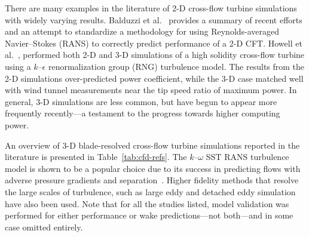 \documentclass[aip,graphicx]{revtex4-1}
\begin{document}
There are many examples in the literature of 2-D cross-flow turbine simulations
with widely varying results. Balduzzi et al.~\cite{Balduzzi2016} provides
a summary of recent efforts and an attempt to standardize a methodology for
using Reynolds-averaged Navier--Stokes (RANS) to correctly predict performance
of a 2-D CFT. Howell et al.~\cite{Howell2010}, performed both 2-D and 3-D
simulations of a high solidity cross-flow turbine using a $k$--$\epsilon$
renormalization group (RNG) turbulence model. The results from the 2-D
simulations over-predicted power coefficient, while the 3-D case matched well
with wind tunnel measurements near the tip speed ratio of maximum power. In
general, 3-D simulations are less common, but have begun to appear more
frequently recently---a testament to the progress towards higher computing
power.

An overview of 3-D blade-resolved cross-flow turbine simulations reported in the
literature is presented in Table~\ref{tab:cfd-refs}. The $k$--$\omega$ SST RANS
turbulence model is shown to be a popular choice due to its success in
predicting flows with adverse pressure gradients and
separation~\cite{Menter2003}. Higher fidelity methods that resolve the large
scales of turbulence, such as large eddy and detached eddy simulation have also
been used. Note that for all the studies listed, model validation was performed
for either performance or wake predictions---not both---and in some case omitted
entirely.
\end{document}
